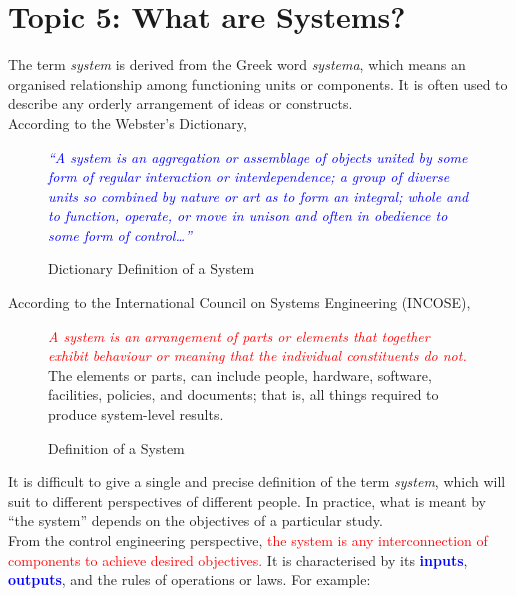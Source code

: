 \documentclass[../notes-main.tex]{subfiles}
\begin{document}
\section{Topic 5: What are Systems?}
The term \emph{system} is derived from the Greek word \emph{systema}, which means an organised relationship among functioning units or components. It is often used to describe any orderly arrangement of ideas or constructs.\\
According to the Webster's Dictionary,
\begin{figure}[H]
    \centering
    \begin{mdframed}
        \begin{center}
            \textcolor{blue}{%
                \emph{``A system is an aggregation or assemblage of objects united by some form of regular interaction or interdependence; a group of diverse units so combined by nature or art as to form an integral; whole and to function, operate, or move in unison and often in obedience to some form of control\dots''}}
        \end{center}
    \end{mdframed}\label{fig:system-def-1}
    \vspace{-1em}\caption{Dictionary Definition of a System}
\end{figure}
\noindent According to the International Council on Systems Engineering (INCOSE),
\begin{figure}[H]
    \centering
    \begin{mdframed}
        \begin{center}
            \textcolor{red}{%
                \emph{A system is an arrangement of parts or elements that together exhibit behaviour or meaning that the individual constituents do not.}}\\ The elements or parts, can include people, hardware, software, facilities, policies, and documents; that is, all things required to produce system-level results.
        \end{center}
    \end{mdframed}\label{fig:system-def-2}
    \vspace{-1em}\caption{Definition of a System}
\end{figure}
\noindent It is difficult to give a single and precise definition of the term \emph{system}, which will suit to different perspectives of different people. In practice, what is meant by ``the system'' depends on the objectives of a particular study.\\
From the control engineering perspective, \textcolor{red}{the system is any interconnection of components to achieve desired objectives.} It is characterised by its \textbf{\textcolor{blue}{inputs}}, \textbf{\textcolor{blue}{outputs}}, and the rules of operations or laws. For example:
\end{document}
